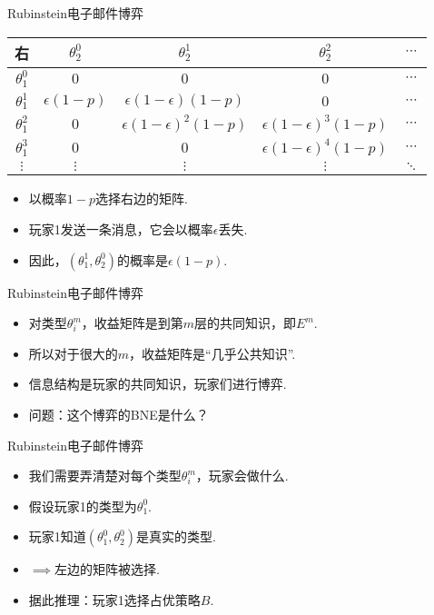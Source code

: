 {Rubinstein电子邮件博弈}
\begin{table}[ht]
    \centering
\begin{tabular}{c|cccc}
右& $\theta_2^0$ & $\theta_2^1$ & $\theta_2^2$ & $\cdots$ \\
\hline
$\theta_1^0$ & $0$ & $0$ & $0$ & $\cdots$ \\
$\theta_1^1$ & $\epsilon(1 - p)$ & $\epsilon(1 - \epsilon)(1 - p)$ & $0$ & $\cdots$ \\
$\theta_1^2$ & $0$ & $\epsilon(1 - \epsilon)^2(1 - p)$ & $\epsilon(1 - \epsilon)^3(1 - p)$ & $\cdots$ \\
$\theta_1^3$ & $0$ & $0$ & $\epsilon(1 - \epsilon)^4(1 - p)$ & $\cdots$ \\
$\vdots$ & $\vdots$ & $\vdots$ & $\vdots$ & $\ddots$
\end{tabular}
\end{table}
\begin{itemize}
\item 以概率$1 - p$选择右边的矩阵.
\item 玩家1发送一条消息，它会以概率$\epsilon$丢失.
\item 因此，$(\theta_1^1,\theta_2^0)$的概率是$\epsilon(1 - p)$.
\end{itemize}



{Rubinstein电子邮件博弈}
\begin{itemize}
\item 对类型$\theta_i^m$，收益矩阵是到第$m$层的共同知识，即$E^m$.
\item 所以对于很大的$m$，收益矩阵是“几乎公共知识”.
\item 信息结构是玩家的共同知识，玩家们进行博弈.
\item 问题：这个博弈的BNE是什么？
\end{itemize}


{Rubinstein电子邮件博弈}
\begin{itemize}
\item 我们需要弄清楚对每个类型$\theta_i^m$，玩家会做什么.
\item 假设玩家1的类型为$\theta_1^0$.
\item 玩家1知道$(\theta_1^0,\theta_2^0)$是真实的类型.
\item$\implies$左边的矩阵被选择.
\item 据此推理：玩家1选择占优策略$B$.
\end{itemize}


